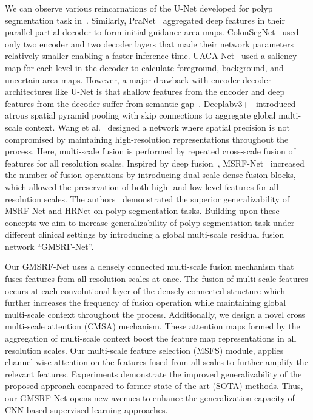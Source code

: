 \documentclass[conference]{IEEEtran}
\begin{document}
We can observe various reincarnations of the U-Net developed for polyp segmentation task in~\cite{zhou2019unet++,jha2019resunet++,zhou2018unet++}. Similarly, PraNet~\cite{fan2020pranet} aggregated deep features in their parallel partial decoder to form initial guidance area maps. ColonSegNet~\cite{jha2020real} used only two encoder and two decoder layers that made their network parameters relatively smaller enabling a faster inference time. UACA-Net~\cite{kim2021uacanet} used a saliency map for each level in the decoder to calculate foreground, background, and uncertain area maps.
However, a major drawback with encoder-decoder architectures like U-Net is that shallow features from the encoder and deep features from the decoder suffer from semantic gap~\cite{ibtehaz2020multiresunet}. Deeplabv3+~\cite{chen2018encoder} introduced atrous spatial pyramid pooling with skip connections to aggregate global multi-scale context. Wang et al.~\cite{wang2020deep} designed a network where spatial precision is not compromised by maintaining high-resolution representations throughout the process. Here, multi-scale fusion is performed by repeated cross-scale fusion of features for all resolution scales. Inspired by deep fusion~\cite{sun2018igcv3,xie2018interleaved}, MSRF-Net~\cite{srivastava2021msrf} increased the number of fusion operations by introducing dual-scale dense fusion blocks, which allowed the preservation of both high- and low-level features for all resolution scales. The authors~\cite{srivastava2021msrf} demonstrated the superior generalizability of MSRF-Net and HRNet on polyp segmentation tasks. Building upon these concepts we aim to increase generalizability of polyp segmentation task under different clinical settings by introducing a global multi-scale residual fusion network ``GMSRF-Net''. 

Our GMSRF-Net uses a densely connected multi-scale fusion mechanism that fuses features from all resolution scales at once. The fusion of multi-scale features occurs at each convolutional layer of the densely connected structure which further increases the frequency of fusion operation while maintaining global multi-scale context throughout the process. Additionally, we design a novel cross multi-scale attention (CMSA) mechanism. These attention maps formed by the aggregation of multi-scale context boost the feature map representations in all resolution scales. Our multi-scale feature selection (MSFS) module, applies channel-wise attention on the features fused from all scales to further amplify the relevant features. Experiments demonstrate the improved generalizability of the proposed approach compared to former state-of-the-art (SOTA) methods. Thus, our GMSRF-Net opens new avenues to enhance the generalization capacity of CNN-based supervised learning approaches.
\end{document}
